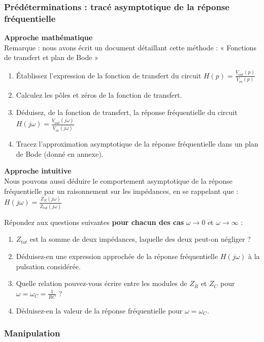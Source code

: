 \documentclass{../template/tp}
\begin{document}
\subsubsection{Prédéterminations : tracé asymptotique de la réponse fréquentielle}
\begin{predet}
\textbf{Approche mathématique}\\
Remarque : nous avons écrit un document détaillant cette méthode : « Fonctions de transfert et plan de Bode »
\begin{enumerate}
\item Établissez l'expression de la fonction de transfert du circuit $H(p)=\frac{\underline{V}_{out}(p)}{\underline{V}_{in}(p)}$
\item Calculez les pôles et zéros de la fonction de transfert.
\item Déduisez, de la fonction de transfert, la réponse fréquentielle du circuit $H(j\omega)=\frac{\underline{V}_{out}(j\omega)}{\underline{V}_{in}(j\omega)}$
\item Tracez l'approximation asymptotique de la réponse fréquentielle dans un plan de Bode (donné en annexe).
\end{enumerate}

\textbf{Approche intuitive}\\
Nous pouvons aussi déduire le comportement asymptotique de la réponse fréquentielle par un raisonnement sur les impédances, en se rappelant que :
$H(j\omega)=\frac{Z_R(j\omega)}{Z_{tot}(j\omega)}$

\Question
{
Répondez aux questions suivantes \textbf{pour chacun des cas} $\omega \rightarrow 0$ et  $\omega \rightarrow \infty$ :
\begin{enumerate}
\item $Z_{tot}$ est la somme de deux impédances, laquelle des deux peut-on négliger ?
\item Déduisez-en une expression approchée de la réponse fréquentielle $H(j\omega)$ à la pulsation considérée.
\item Quelle relation pouvez-vous écrire entre les modules de $Z_R$ et $Z_C$ pour $\omega = \omega_C=\frac{1}{RC}$ ?
\item Déduisez-en la valeur de la réponse fréquentielle pour $\omega = \omega_C$.
\end{enumerate}
}
{}
\end{predet}

\subsubsection{Manipulation}
\end{document}
